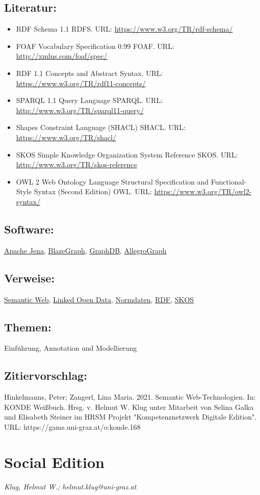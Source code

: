 \documentclass{article}
\begin{document}
        \subsection*{Literatur:}\begin{itemize}\item RDF Schema 1.1 RDFS. URL: \url{https://www.w3.org/TR/rdf-schema/}\item FOAF Vocabulary Specification 0.99 FOAF. URL: \url{http://xmlns.com/foaf/spec/}\item RDF 1.1 Concepts and Abstract Syntax. URL: \url{https://www.w3.org/TR/rdf11-concepts/}\item SPARQL 1.1 Query Language SPARQL. URL: \url{http://www.w3.org/TR/sparql11-query/}\item Shapes Constraint Language (SHACL) SHACL. URL: \url{https://www.w3.org/TR/shacl/}\item SKOS Simple Knowledge Organization System Reference SKOS. URL: \url{http://www.w3.org/TR/skos-reference}\item OWL 2 Web Ontology Language Structural Specification and Functional-Style Syntax (Second Edition) OWL. URL: \url{https://www.w3.org/TR/owl2-syntax/}\end{itemize}\subsection*{Software:}\href{https://jena.apache.org/}{Apache Jena}, \href{https://www.blazegraph.com/}{BlazeGraph}, \href{https://www.ontotext.com/graphdb‎}{GraphDB}, \href{https://franz.com/agraph/allegrograph/}{AllegroGraph}\subsection*{Verweise:}\href{https://gams.uni-graz.at/o:konde.167}{Semantic Web}, \href{https://gams.uni-graz.at/o:konde.8}{Linked Open Data}, \href{https://gams.uni-graz.at/o:konde.147}{Normdaten}, \href{https://gams.uni-graz.at/o:konde.131}{RDF}, \href{https://gams.uni-graz.at/o:konde.132}{SKOS}\subsection*{Themen:}Einführung, Annotation und Modellierung\subsection*{Zitiervorschlag:}Hinkelmanns, Peter; Zangerl, Lina Maria. 2021. Semantic Web-Technologien. In: KONDE Weißbuch. Hrsg. v. Helmut W. Klug unter Mitarbeit von Selina Galka und Elisabeth Steiner im HRSM Projekt "Kompetenznetzwerk Digitale Edition". URL: https://gams.uni-graz.at/o:konde.168\newpage\section*{Social Edition} \emph{Klug, Helmut W.; helmut.klug@uni-graz.at }\\
        
\end{document}
